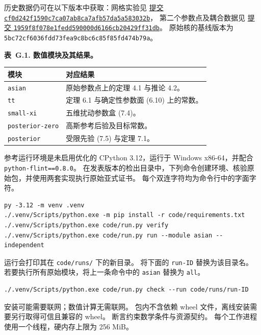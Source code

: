 历史数据仍可在以下版本中获取：网格实验见
\href{https://github.com/130U/certified-valuation-arithmetic-asian-options/tree/cf0d242f1590c7ca07ab8ca7afb57da5a583032b}{提交 \texttt{cf0d242f1590c7ca07ab8ca7afb57da5a583032b}}，
第二个参数点及耦合数据见
\href{https://github.com/130U/certified-valuation-arithmetic-asian-options/tree/1959f8f078e1fedd590000d6166cb20429ff31db}{提交 \texttt{1959f8f078e1fedd590000d6166cb20429ff31db}}。
原始核的基线版本为 \texttt{5bc72cf6036fdd73fea9c8bc6c85f85fd474b79a}。

\noindent\textbf{表~G.1. 数值模块及其结果。}
\begin{center}
\begin{tabularx}{\textwidth}{@{}l X@{}}
\toprule
模块 & 对应结果 \\
\midrule
\texttt{asian} & 原始参数点上的定理 4.1 与推论 4.2。 \\
\texttt{tt} & 定理 6.1 与确定性参数面 (6.10) 上的常数。 \\
\texttt{small-xi} & 五维扰动参数盒 (7.4)。 \\
\texttt{posterior-zero} & 高斯参考后验及目标常数。 \\
\texttt{posterior} & 受限先验 (7.5) 与定理 7.1。 \\
\bottomrule
\end{tabularx}
\end{center}

参考运行环境是未启用优化的 CPython 3.12，运行于 Windows x86-64，并配合 \texttt{python-flint==0.8.0}。
在发表版本的检出目录中，下列命令创建环境、核验原始包，并使用两套实现执行原始亚式证书。
每个双连字符均为命令行中的字面字符。

\begin{verbatim}
py -3.12 -m venv .venv
./.venv/Scripts/python.exe -m pip install -r code/requirements.txt
./.venv/Scripts/python.exe code/run.py verify
./.venv/Scripts/python.exe code/run.py run --module asian --independent
\end{verbatim}

运行会打印其在 \texttt{code/runs/} 下的新目录。
将下面的 \texttt{run-ID} 替换为该目录名。
若要执行所有原始模块，将上一条命令中的 \texttt{asian} 替换为 \texttt{all}。

\begin{verbatim}
./.venv/Scripts/python.exe code/run.py check --run code/runs/run-ID
\end{verbatim}

安装可能需要联网；数值计算无需联网。
包内不含依赖 wheel 文件，离线安装需要另行取得可信且兼容的 wheel。
断言约束数学条件与资源契约。
每个工作进程使用一个线程，硬内存上限为 256 MiB。

